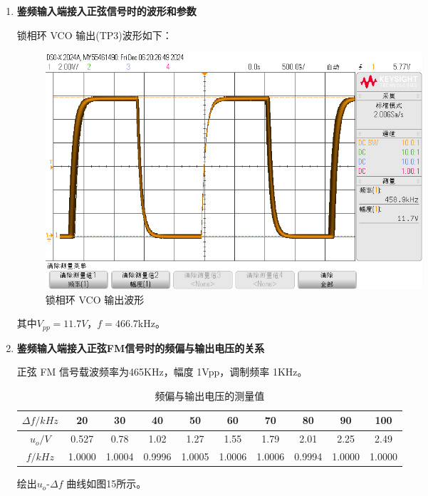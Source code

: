 \documentclass[UTF8]{ctexart}
\begin{document}
\begin{enumerate}[(1)]
    \item \textbf{鉴频输入端接入正弦信号时的波形和参数}

    锁相环 VCO 输出(TP3)波形如下：

    \begin{figure}[H]
        \centering
        
        \includegraphics[width=0.7\textwidth]{pics/31.png}
        \caption{锁相环 VCO 输出波形}\label{fig:31}
    \end{figure}

    其中$V_{pp}=11.7V$，$f=466.7$kHz。

    \item \textbf{鉴频输入端接入正弦FM信号时的频偏与输出电压的关系}
    
    正弦 FM 信号载波频率为465KHz，幅度 1Vpp，调制频率 1KHz。
    
    \begin{table}[!ht]
        \centering

        \caption{频偏与输出电压的测量值}
        
        \begin{tabular}{|c|c|c|c|c|c|c|c|c|c|}
        \hline
        $\Delta f/kHz$ & 20    & 30   & 40   & 50   & 60   & 70   & 80   & 90   & 100  \\ \hline
        $u_o/V$        & 0.527 & 0.78 & 1.02 & 1.27 & 1.55 & 1.79 & 2.01 & 2.25 & 2.49 \\ \hline
        $f/kHz$        & 1.0000 & 1.0004 & 0.9996 & 1.0005 & 1.0006 & 1.0006 & 0.9994 & 1.0000 & 1.0000 \\ \hline
        \end{tabular}
    \end{table}

    绘出$u_o$-$\Delta f$ 曲线如图15所示。

    \begin{figure}[H]
        \centering
        

\end{figure}
\end{enumerate}
\end{document}
